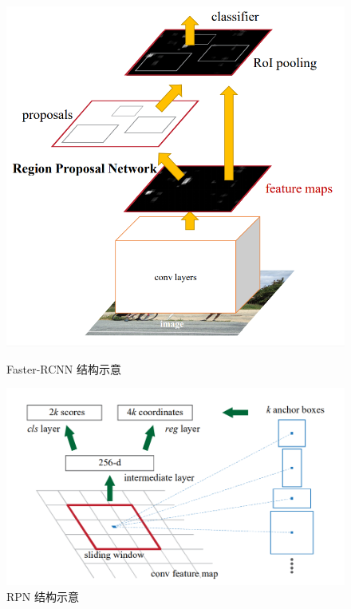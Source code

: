 \begin{figure}[!t]
	\centering
	\begin{minipage}[t]{0.4\textwidth}
		\centering
		\includegraphics[width=\textwidth]{./imgs/faster-rcnn.png}
		\caption{Faster-RCNN 结构示意}
		\label{fig:faster-rcnn}
	\end{minipage}
	\begin{minipage}[t]{0.58\textwidth}
		\centering
		\includegraphics[width=\textwidth]{./imgs/rpn.png}
		\caption{RPN 结构示意}
		\label{fig:rpn}
	\end{minipage}
\end{figure}
